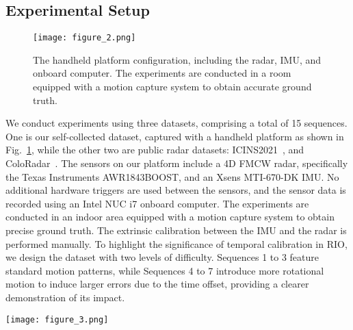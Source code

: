 \subsection{Experimental Setup}
\label{sec: experimental_setup}
\begin{figure}[t]
\centering \texttt{[image: figure\_2.png]} \caption{The handheld platform configuration, including the radar, IMU, and onboard computer. The experiments are conducted in a room equipped with a motion capture system to obtain accurate ground truth.}
\label{fig2}
\end{figure}

We conduct experiments using three datasets, comprising a total of 15 sequences. One is our self-collected dataset, captured with a handheld platform as shown in Fig.~\ref{fig2}, while the other two are public radar datasets: ICINS2021~\cite{9470842}, and ColoRadar~\cite{kramer2022coloradar}. The sensors on our platform include a 4D FMCW radar, specifically the Texas Instruments AWR1843BOOST, and an Xsens MTI-670-DK IMU. No additional hardware triggers are used between the sensors, and the sensor data is recorded using an Intel NUC i7 onboard computer. The experiments are conducted in an indoor area equipped with a motion capture system to obtain precise ground truth. The extrinsic calibration between the IMU and the radar is performed manually. To highlight the significance of temporal calibration in RIO, we design the dataset with two levels of difficulty. Sequences 1 to 3 feature standard motion patterns, while Sequences 4 to 7 introduce more rotational motion to induce larger errors due to the time offset, providing a clearer demonstration of its impact.

\begin{figure*}[t]
\centering
\texttt{[image: figure\_3.png]}
\caption{Comparison of estimated trajectories with the ground truth. The \textcolor{black}{black} trajectory is the ground truth, the \textcolor{blue}{blue} one is the EKF-RIO, which does not account for temporal calibration, and the \textcolor{red}{red} one is the proposed RIO with online temporal calibration. Results are presented for Sequence 4, ICINS 1, and ColoRadar 1, representing one sequence from each of the three datasets.}
\label{trajectory}
\end{figure*}

